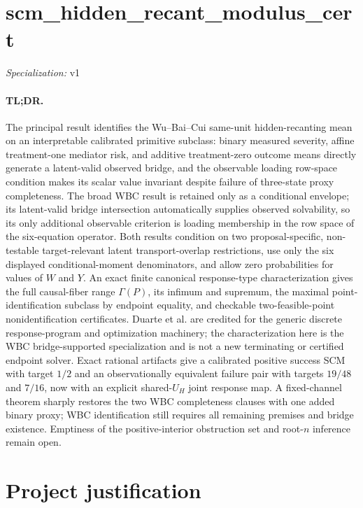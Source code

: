 \documentclass{article}
\begin{document}
\sloppy

\section*{scm\_\allowbreak{}hidden\_\allowbreak{}recant\_\allowbreak{}modulus\_\allowbreak{}cert}

\noindent\textit{Specialization:} v1\par

\paragraph{TL;DR.} The principal result identifies the Wu--Bai--Cui same-unit hidden-recanting mean on an interpretable calibrated primitive subclass: binary measured severity, affine treatment-one mediator risk, and additive treatment-zero outcome means directly generate a latent-valid observed bridge, and the observable loading row-space condition makes its scalar value invariant despite failure of three-state proxy completeness. The broad WBC result is retained only as a conditional envelope; its latent-valid bridge intersection automatically supplies observed solvability, so its only additional observable criterion is loading membership in the row space of the six-equation operator. Both results condition on two proposal-specific, non-testable target-relevant latent transport-overlap restrictions, use only the six displayed conditional-moment denominators, and allow zero probabilities for values of \(W\) and \(Y\). An exact finite canonical response-type characterization gives the full causal-fiber range \(\Gamma(P)\), its infimum and supremum, the maximal point-identification subclass by endpoint equality, and checkable two-feasible-point nonidentification certificates. Duarte et al. are credited for the generic discrete response-program and optimization machinery; the characterization here is the WBC bridge-supported specialization and is not a new terminating or certified endpoint solver. Exact rational artifacts give a calibrated positive success SCM with target \(1/2\) and an observationally equivalent failure pair with targets \(19/48\) and \(7/16\), now with an explicit shared-\(U_H\) joint response map. A fixed-channel theorem sharply restores the two WBC completeness clauses with one added binary proxy; WBC identification still requires all remaining premises and bridge existence. Emptiness of the positive-interior obstruction set and root-\(n\) inference remain open.

\section{Project justification}
\end{document}
